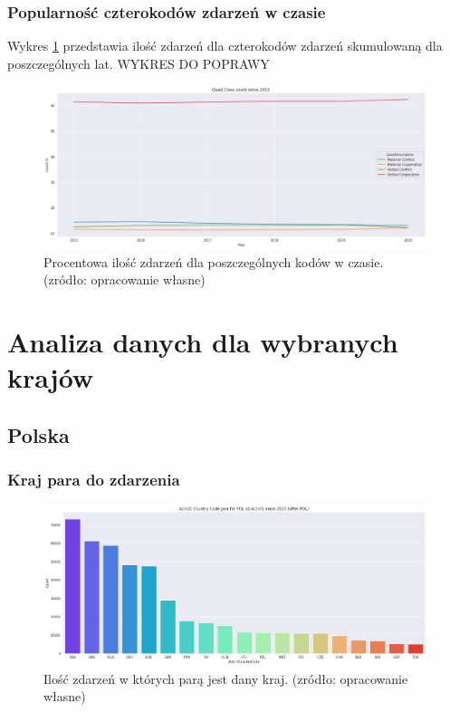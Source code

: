 \documentclass[11pt]{report}
\begin{document}
 \subsection{Popularność czterokodów zdarzeń w czasie}
  Wykres \ref{fig:GLOBALQCperc} przedstawia ilość zdarzeń dla czterokodów zdarzeń skumulowaną dla poszczególnych lat.
   WYKRES DO POPRAWY
    \begin{figure}[ht]
	\centering
	\includegraphics[width=0.8 \textwidth]{fig/GLOBAL/QCperc.png}
	\caption{Procentowa ilość zdarzeń dla poszczególnych kodów w czasie. (zródło: opracowanie własne)}
	\label{fig:GLOBALQCperc}
	\end{figure}

 
 \chapter{Analiza danych dla wybranych krajów}
 \section{Polska}
 
 \subsection{Kraj para do zdarzenia}
    
    \begin{figure}[ht]
	\centering
	\includegraphics[width=0.8 \textwidth]{fig/PL/PLactor2Pair.png}
	\caption{Ilość zdarzeń w których parą jest dany kraj. (zródło: opracowanie własne)}
	\label{fig:PLpair}
	\end{figure}
	
\end{document}
